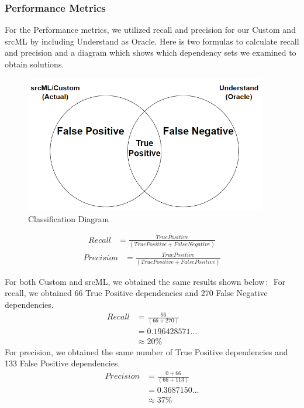 \documentclass[12pt, dvipsnames, a4paper]{article}
\begin{document}
\subsubsection{Performance Metrics}
For the Performance metrics, we utilized recall and precision for our Custom and srcML by including Understand as Oracle.
Here is two formulas to calculate recall and precision and a diagram which shows which dependency sets we examined to obtain solutions.
\begin{figure}[h]
    \center
    \includegraphics[width=300pt]{assets/recall_precision_diagram.PNG}
    \caption{Classification Diagram}
\end{figure}

\begin{equation*}
    \begin{split}
    Recall &= \frac{True Positive}{(True Positive + False Negative)}
    \end{split}
\end{equation*}
\newline
\begin{equation*}
    \begin{split}
    Precision &= \frac{True Positive}{(True Positive + False Positive)}
    \end{split}
\end{equation*}

For both Custom and srcML, we obtained the same results shown below$\,\colon\,$
\newline
For recall, we obtained 66 True Positive dependencies and 270 False Negative dependencies. 
\begin{equation*}
    \begin{split}
    Recall &= \frac{66}{(66 + 270)}\\
    &= 0.196428571\dots\\
    &\approx 20\%
    \end{split}
\end{equation*}
For precision, we obtained the same number of True Positive dependencies and 133 False Positive dependencies.
\begin{equation*}
    \begin{split}
    Precision &= \frac{0 + 66}{(66 + 113)}\\
    &= 0.3687150\dots\\
    &\approx 37\%
    \end{split}
\end{equation*}
\end{document}
